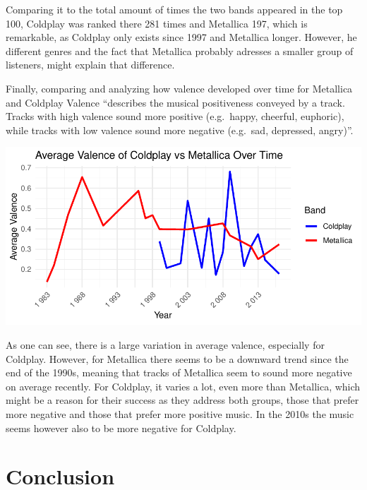 \documentclass[11pt,preprint, authoryear]{elsarticle}
\let\origfigure\figure
\let\endorigfigure\endfigure
\renewenvironment{figure}[1][2] {
    \expandafter\origfigure\expandafter[H]
} {
    \endorigfigure
}
\numberwithin{equation}{section}
\numberwithin{figure}{section}
\numberwithin{table}{section}
\begin{document}
Comparing it to the total amount of times the two bands appeared in the
top 100, Coldplay was ranked there 281 times and Metallica 197, which is
remarkable, as Coldplay only exists since 1997 and Metallica longer.
However, he different genres and the fact that Metallica probably
adresses a smaller group of listeners, might explain that difference.

Finally, comparing and analyzing how valence developed over time for
Metallica and Coldplay Valence ``describes the musical positiveness
conveyed by a track. Tracks with high valence sound more positive
(e.g.~happy, cheerful, euphoric), while tracks with low valence sound
more negative (e.g.~sad, depressed, angry)''.

\begin{figure}[H]

{\centering \includegraphics{Question2_files/figure-latex/Figure5-1} 

}

\caption{Valence over time \label{Figure5}}\label{fig:Figure5}
\end{figure}

As one can see, there is a large variation in average valence,
especially for Coldplay. However, for Metallica there seems to be a
downward trend since the end of the 1990s, meaning that tracks of
Metallica seem to sound more negative on average recently. For Coldplay,
it varies a lot, even more than Metallica, which might be a reason for
their success as they address both groups, those that prefer more
negative and those that prefer more positive music. In the 2010s the
music seems however also to be more negative for Coldplay.

\hypertarget{conclusion}{%
\section{Conclusion}\label{conclusion}}
\end{document}
